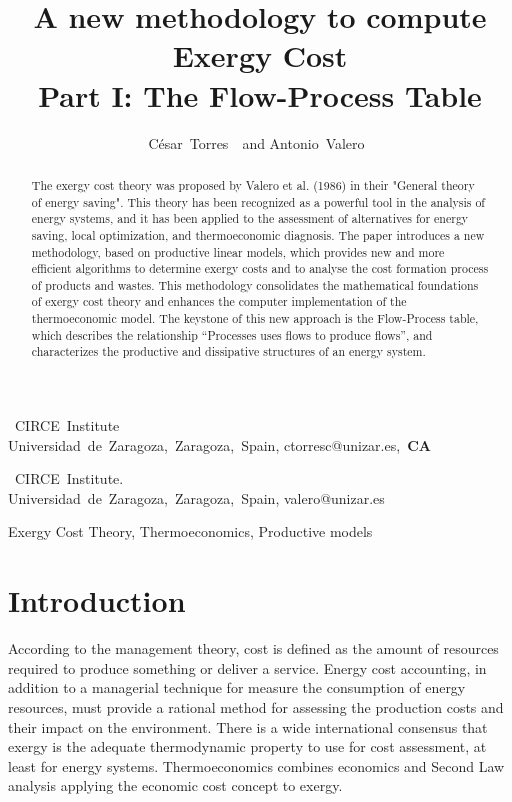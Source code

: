 \documentclass{ecos2018}
\title{A new methodology to compute Exergy Cost\\ Part I: The Flow-Process Table}
\author{%
      \mbox{C\'esar Torres \refauth{a}}~and
      \mbox{Antonio Valero \refauth{b}}}
\begin{document}
\maketitle

\begin{address}
 \mbox{ CIRCE Institute} \\
 \mbox{Universidad de Zaragoza, Zaragoza, Spain,}
 \mbox{ctorresc@unizar.es, \textbf{CA}} \par
 \mbox{ CIRCE Institute.} \\
 \mbox{Universidad de Zaragoza, Zaragoza, Spain,}
 \mbox{valero@unizar.es} \par
\end{address}

\begin{abstract}%
\begin{spacing}{1.1}
The exergy cost theory was proposed by Valero et al. (1986) in their "General theory of energy saving". This theory has been recognized as a powerful tool in the analysis of energy systems, and it has been applied to the assessment of alternatives for energy saving, local optimization, and thermoeconomic diagnosis.
The paper introduces a new methodology, based on productive linear models, which provides new and more efficient algorithms to determine exergy costs and to analyse the cost formation process of products and wastes. This methodology consolidates the mathematical foundations of exergy cost theory and enhances the computer implementation of the thermoeconomic  model.
The keystone of this new approach is the Flow-Process table, which describes the  relationship “Processes uses flows to produce flows”, and characterizes the productive and dissipative structures of an energy system. 
\end{spacing}
\end{abstract}

\begin{keywords}
Exergy Cost Theory, Thermoeconomics, Productive models
\end{keywords}

\section{Introduction}
According to the management theory, cost is defined as the amount of resources required to produce something or deliver a service. Energy cost accounting, in addition to a managerial technique for measure the consumption of energy resources, must provide a rational method for assessing the production costs and their impact on the environment.
There is a wide international consensus that exergy is the adequate thermodynamic property to use for cost assessment, at least for energy systems. Thermoeconomics combines economics and Second Law analysis applying the economic cost concept to exergy.
\end{document}

